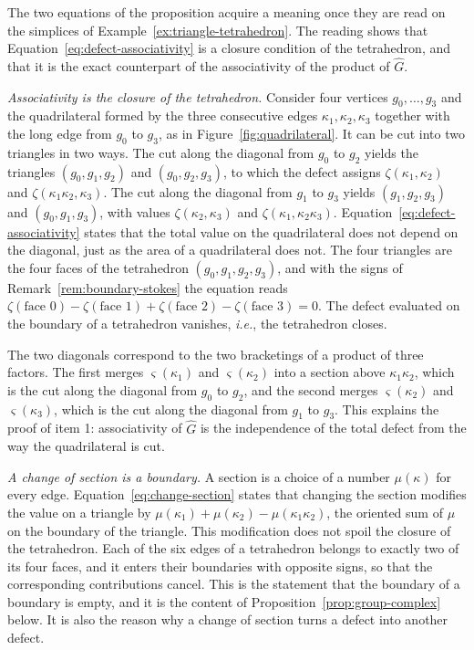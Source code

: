 The two equations of the proposition acquire a meaning once they are read on the simplices of Example~\ref{ex:triangle-tetrahedron}. The reading shows that Equation~\eqref{eq:defect-associativity} is a closure condition of the tetrahedron, and that it is the exact counterpart of the associativity of the product of $\widehat{G}$.

\begin{remark}\label{rem:picture-reading}
	\emph{Associativity is the closure of the tetrahedron.} Consider four vertices $g_0,\dots,g_3$ and the quadrilateral formed by the three consecutive edges $\kappa_1,\kappa_2,\kappa_3$ together with the long edge from $g_0$ to $g_3$, as in Figure~\ref{fig:quadrilateral}. It can be cut into two triangles in two ways. The cut along the diagonal from $g_0$ to $g_2$ yields the triangles $(g_0,g_1,g_2)$ and $(g_0,g_2,g_3)$, to which the defect assigns $\zeta(\kappa_1,\kappa_2)$ and $\zeta(\kappa_1\kappa_2,\kappa_3)$. The cut along the diagonal from $g_1$ to $g_3$ yields $(g_1,g_2,g_3)$ and $(g_0,g_1,g_3)$, with values $\zeta(\kappa_2,\kappa_3)$ and $\zeta(\kappa_1,\kappa_2\kappa_3)$. Equation~\eqref{eq:defect-associativity} states that the total value on the quadrilateral does not depend on the diagonal, just as the area of a quadrilateral does not. The four triangles are the four faces of the tetrahedron $(g_0,g_1,g_2,g_3)$, and with the signs of Remark~\ref{rem:boundary-stokes} the equation reads $\zeta(\text{face }0)-\zeta(\text{face }1)+\zeta(\text{face }2)-\zeta(\text{face }3)=0$. The defect evaluated on the boundary of a tetrahedron vanishes, \textit{i.e.}, the tetrahedron closes.
	
	The two diagonals correspond to the two bracketings of a product of three factors. The first merges $\varsigma(\kappa_1)$ and $\varsigma(\kappa_2)$ into a section above $\kappa_1\kappa_2$, which is the cut along the diagonal from $g_0$ to $g_2$, and the second merges $\varsigma(\kappa_2)$ and $\varsigma(\kappa_3)$, which is the cut along the diagonal from $g_1$ to $g_3$. This explains the proof of item 1: associativity of $\widehat{G}$ is the independence of the total defect from the way the quadrilateral is cut.
	
	\emph{A change of section is a boundary.} A section is a choice of a number $\mu(\kappa)$ for every edge. Equation~\eqref{eq:change-section} states that changing the section modifies the value on a triangle by $\mu(\kappa_1)+\mu(\kappa_2)-\mu(\kappa_1\kappa_2)$, the oriented sum of $\mu$ on the boundary of the triangle. This modification does not spoil the closure of the tetrahedron. Each of the six edges of a tetrahedron belongs to exactly two of its four faces, and it enters their boundaries with opposite signs, so that the corresponding contributions cancel. This is the statement that the boundary of a boundary is empty, and it is the content of Proposition~\ref{prop:group-complex} below. It is also the reason why a change of section turns a defect into another defect.
\end{remark}

